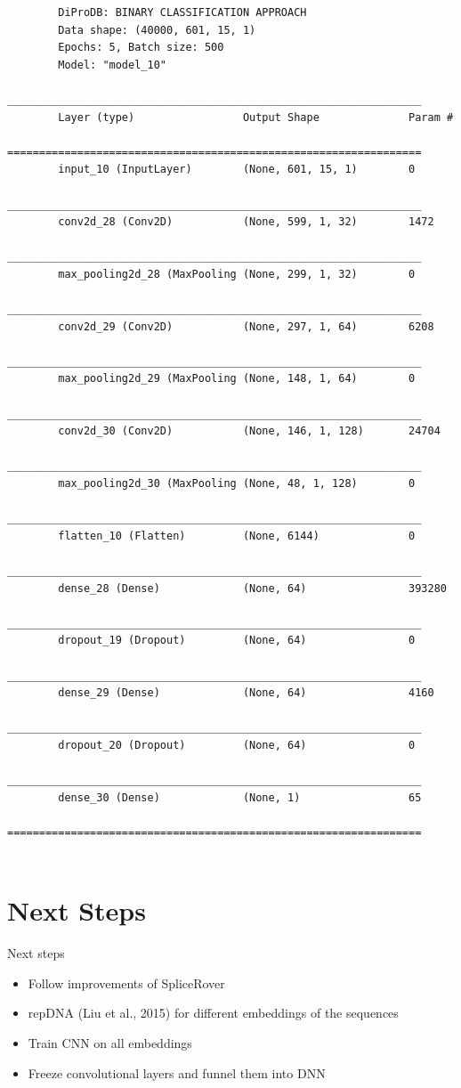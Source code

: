 \documentclass[10pt]{beamer}
\begin{document}
\begin{frame}[fragile]
	\tiny
	\begin{lstlisting}
		DiProDB: BINARY CLASSIFICATION APPROACH
		Data shape: (40000, 601, 15, 1)
		Epochs: 5, Batch size: 500
		Model: "model_10"
		_________________________________________________________________
		Layer (type)                 Output Shape              Param #   
		=================================================================
		input_10 (InputLayer)        (None, 601, 15, 1)        0         
		_________________________________________________________________
		conv2d_28 (Conv2D)           (None, 599, 1, 32)        1472      
		_________________________________________________________________
		max_pooling2d_28 (MaxPooling (None, 299, 1, 32)        0         
		_________________________________________________________________
		conv2d_29 (Conv2D)           (None, 297, 1, 64)        6208      
		_________________________________________________________________
		max_pooling2d_29 (MaxPooling (None, 148, 1, 64)        0         
		_________________________________________________________________
		conv2d_30 (Conv2D)           (None, 146, 1, 128)       24704     
		_________________________________________________________________
		max_pooling2d_30 (MaxPooling (None, 48, 1, 128)        0         
		_________________________________________________________________
		flatten_10 (Flatten)         (None, 6144)              0         
		_________________________________________________________________
		dense_28 (Dense)             (None, 64)                393280    
		_________________________________________________________________
		dropout_19 (Dropout)         (None, 64)                0         
		_________________________________________________________________
		dense_29 (Dense)             (None, 64)                4160      
		_________________________________________________________________
		dropout_20 (Dropout)         (None, 64)                0         
		_________________________________________________________________
		dense_30 (Dense)             (None, 1)                 65        
		=================================================================
		
	\end{lstlisting}
\end{frame}

\section{Next Steps}
\begin{frame}{Next steps}
	\begin{itemize}
		\item Follow improvements of SpliceRover
		\item repDNA (Liu et al., 2015) for different embeddings of the sequences
		\item Train CNN on all embeddings
		\item Freeze convolutional layers and funnel them into DNN
	\end{itemize}
\end{frame}
\end{document}
